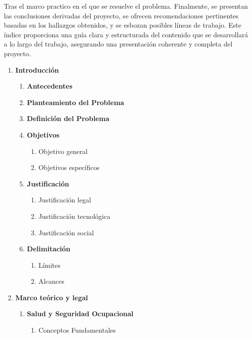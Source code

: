 Tras el marco practico en el que se resuelve el problema. Finalmente, se presentan las conclusiones derivadas del proyecto, se ofrecen recomendaciones pertinentes basadas en los hallazgos obtenidos, y se esbozan posibles líneas de trabajo. Este índice proporciona una guía clara y estructurada del contenido que se desarrollará a lo largo del trabajo, asegurando una presentación coherente y completa del proyecto.

\begin{enumerate}[label*=\arabic*.]
    \item \textbf{Introducción}
    \begin{enumerate}[label*=\arabic*.]
        \item \textbf{Antecedentes}
        \item \textbf{Planteamiento del Problema}
        \item \textbf{Definición del Problema}
        \item \textbf{Objetivos}
        \begin{enumerate}[label*=\arabic*.]
            \item Objetivo general
            \item Objetivos específicos
        \end{enumerate}
        \item \textbf{Justificación}
        \begin{enumerate}[label*=\arabic*.]
            \item Justificación legal
            \item Justificación tecnológica
            \item Justificación social
        \end{enumerate}
        \item \textbf{Delimitación}
        \begin{enumerate}[label*=\arabic*.]
            \item Límites
            \item Alcances
        \end{enumerate}
    \end{enumerate}
    \item \textbf{Marco teórico y legal}
    \begin{enumerate}[label*=\arabic*.]
        \item \textbf{Salud y Seguridad Ocupacional}
        \begin{enumerate}[label*=\arabic*.]
            \item Conceptos Fundamentales

\end{enumerate}
\end{enumerate}
\end{enumerate}
